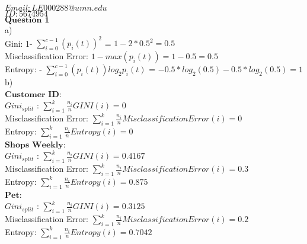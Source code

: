 \documentclass[12pt]{article}
\begin{document}
$Email: LE000288@umn.edu$\\

$ID:5674954$\\

$\textbf{Question 1}$\\

a)\\

Gini: 1- $\sum_{i=0}^{c-1}(p_i(t))^2$ = $1 - 2* 0.5^2 = 0.5$\\

Misclassification Error: $1-max(p_i(t)) = 1- 0.5 =0.5$\\

Entropy: - $\sum_{i=0}^{c-1}(p_i(t))log_2p_i(t)$ = $-0.5*log_2(0.5)-0.5*log_2(0.5) = 1$\\

b)\\

$\textbf{Customer ID}$:\\

$Gini_{split}$ : $\sum_{i=1}^{k}\frac{n_i}{n}GINI(i) = 0$\\

Misclassification Error: $\sum_{i=1}^{k}\frac{n_i}{n}Misclassification Error(i) = 0$\\

Entropy: $\sum_{i=1}^{k}\frac{n_i}{n}Entropy(i) = 0$\\

$\textbf{Shops Weekly}$:\\

$Gini_{split}$ : $\sum_{i=1}^{k}\frac{n_i}{n}GINI(i) = 0.4167$\\

Misclassification Error: $\sum_{i=1}^{k}\frac{n_i}{n}Misclassification Error(i) = 0.3$\\

Entropy: $\sum_{i=1}^{k}\frac{n_i}{n}Entropy(i) = 0.875$\\

$\textbf{Pet}$:\\

$Gini_{split}$ : $\sum_{i=1}^{k}\frac{n_i}{n}GINI(i) = 0.3125$\\

Misclassification Error: $\sum_{i=1}^{k}\frac{n_i}{n}Misclassification Error(i) = 0.2$\\

Entropy: $\sum_{i=1}^{k}\frac{n_i}{n}Entropy(i) = 0.7042$\\
\end{document}

